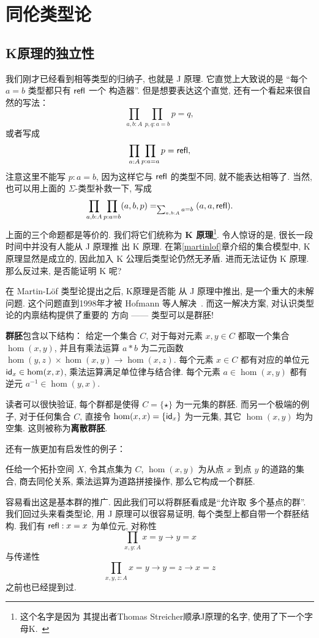 \chapter{同伦类型论}
\section{K原理的独立性}
我们刚才已经看到相等类型的归纳子, 也就是 J 原理. 它直觉上大致说的是
“每个 \(a = b\) 类型都只有 \(\textsf{refl}\) 一个
构造器”. 但是想要表达这个直觉, 还有一个看起来很自然的写法：
\[\prod_{a,b : A} \prod_{p,q : a = b} p = q,\]
或者写成
\[\prod_{a : A} \prod_{p : a = a} p = \textsf{refl},\]
注意这里不能写 \(p : a = b\), 因为这样它与
\(\textsf{refl}\) 的类型不同, 就不能表达相等了.
当然, 也可以用上面的 \(\Sigma\)-类型补救一下, 写成
\[\prod_{a,b : A} \prod_{p: a = b} (a,b,p) =_{\sum_{a,b : A}a = b} (a,a,\textsf{refl}).\]
上面的三个命题都是等价的. 我们将它们统称为
\textbf{K 原理}\footnote{这个名字是因为
其提出者Thomas Streicher顺承J原理的名字, 使用了下一个字母K.~\cite{streicher:1993:K}}.
令人惊讶的是, 很长一段时间中并没有人能从 J 原理推
出 K 原理. 在第\ref{martinlof}章介绍的集合模型中,
K 原理显然是成立的, 因此加入 K 公理后类型论仍然无矛盾.
进而无法证伪 K 原理. 那么反过来, 是否能证明 K 呢?

在 Martin-L\"of 类型论提出之后, K原理是否能
从 J 原理中推出, 是一个重大的未解问题.
这个问题直到1998年才被 Hofmann 等人解决~\cite{hofmann:1998:groupoid}.
而这一解决方案, 对认识类型论的内禀结构提供了重要的
方向 ------ 类型可以是群胚!

\begin{definition}
\textbf{群胚}包含以下结构：
给定一个集合 \(C\), 对于每对元素 \(x,y\in C\)
都取一个集合 \(\hom(x,y)\), 并且有乘法运算
\(a * b\) 为二元函数 \(\hom(y,z) \times \hom(x,y) \to \hom(x,z)\).
每个元素 \(x \in C\) 都有对应的单位元
\(\textsf{id}_x \in \hom(x,x)\), 乘法运算满足单位律与结合律.
每个元素 \(a \in \hom(x,y)\) 都有逆元
\(a^{-1} \in \hom(y,x)\).
\end{definition}
读者可以很快验证, 每个群都是使得 \(C = \{\star\}\)
为一元集的群胚. 而另一个极端的例子, 对于任何集合 \(C\),
直接令 \(\hom(x,x) = \{\textsf{id}_x\}\) 为一元集, 其它 \(\hom(x,y)\)
均为空集. 这则被称为\textbf{离散群胚}.

还有一族更加有启发性的例子：
\begin{theorem}
任给一个拓扑空间 \(X\), 令其点集为
\(C\), \(\hom(x,y)\) 为从点 \(x\) 到点
\(y\) 的道路的集合, 商去同伦关系,
乘法运算为道路拼接操作, 那么它构成一个群胚.
\end{theorem}
容易看出这是基本群的推广. 因此我们可以将群胚看成是“允许取
多个基点的群”. 我们回过头来看类型论,
用 J 原理可以很容易证明, 每个类型上都自带一个群胚结构.
我们有 \(\textsf{refl} : x = x\) 为单位元,
对称性
\[\prod_{x, y : A} x = y \to y = x\]
与传递性
\[\prod_{x,y,z : A} x = y \to y = z \to x = z\]
之前也已经提到过.

